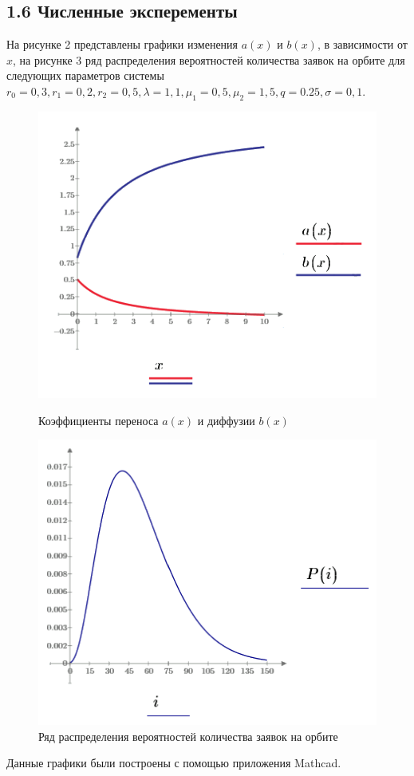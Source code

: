 \subsection{1.6 Численные эксперементы}
На рисунке 2 представлены графики изменения $a(x)$ и $b(x)$, в зависимости от $x$, на рисунке 3 ряд распределения вероятностей количества заявок на орбите для следующих параметров системы $r_{0}=0,3, r_{1}=0,2, r_{2}=0,5, \lambda=1,1, \mu_{1}=0,5, \mu_{2}=1,5, q=0.25, \sigma=0,1.$
\begin{figure}[H]
	\centering
	\begin{minipage}[h]{0.49\linewidth}
		\includegraphics[width=0.8\linewidth]{ab_rab} 	
		\caption{Коэффициенты переноса $a(x)$ и диффузии $b(x)$}
		\label{ris:experimoriginal}
	\end{minipage}
	\hfill
	\begin{minipage}[h]{0.49\linewidth}
		\includegraphics[width=0.8\linewidth]{pb_rab} 
		\caption{Ряд распределения вероятностей количества заявок на орбите}
		\label{ris:experimcoded}
	\end{minipage}
\end{figure}
Данные графики были построены с помощью приложения Mathcad.